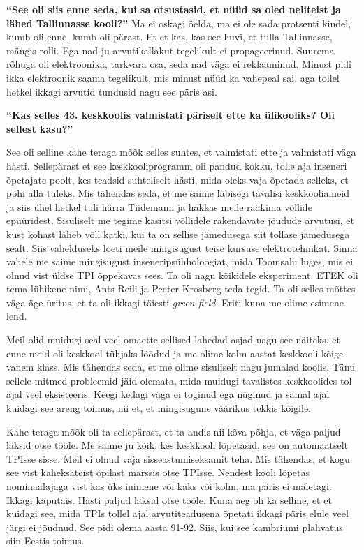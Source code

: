 \textbf{\enquote{See oli siis enne seda, kui sa otsustasid, et nüüd sa oled 
neliteist ja lähed Tallinnasse kooli?}}
Ma ei oskagi öelda, ma ei ole sada protsenti kindel, kumb oli enne, kumb oli 
pärast. Et et kas, kas see huvi, et tulla Tallinnasse, mängis rolli. Ega nad ju 
arvutikallakut tegelikult ei propageerinud.  Suurema rõhuga oli  elektroonika, 
tarkvara osa, seda nad väga ei reklaaminud. Minust pidi ikka elektroonik saama 
tegelikult, mis minust nüüd ka vahepeal sai, aga tollel hetkel ikkagi arvutid 
tundusid nagu see päris asi. 

\textbf{\enquote{Kas selles 43. keskkoolis valmistati päriselt ette ka 
ülikooliks? Oli sellest kasu?}}

See oli selline kahe teraga mõõk selles suhtes, et valmistati ette ja 
valmistati väga hästi. Sellepärast et see keskkooliprogramm oli pandud kokku, 
tolle aja inseneri õpetajate poolt, kes teadsid suhteliselt hästi, mida oleks 
vaja õpetada selleks, et põhi alla tuleks. Mis tähendas seda, et me saime 
läbisegi  tavalisi keskkooliaineid ja siis ühel hetkel tuli härra 
Tiidemann ja hakkas meile rääkima võllide 
epüüridest. Sisuliselt me tegime käsitsi võllidele 
rakendavate jõudude arvutusi, et kust kohast läheb võll katki, kui ta on 
sellise jämedusega siit tollase jämedusega sealt. Siis vahelduseks loeti meile 
mingisugust teise kursuse elektrotehnikat. Sinna vahele me saime mingisugust 
inseneripsühholoogiat, mida Toomsalu luges, mis ei 
olnud vist üldse TPI õppekavas sees. Ta oli nagu kõikidele eksperiment. 
ETEK  oli tema lühikene nimi, Ants Reili ja 
Peeter Krosberg teda tegid. Ta oli selles mõttes 
väga äge üritus, et ta oli ikkagi täiesti \emph{green-field}. Eriti kuna me 
olime esimene lend. 

Meil olid muidugi seal veel omaette sellised lahedad asjad nagu see näiteks, et 
enne meid oli keskkool tühjaks löödud ja me olime kolm aastat keskkooli kõige 
vanem klass. Mis tähendas seda, et me olime sisuliselt nagu jumalad koolis. 
Tänu sellele mitmed probleemid jäid olemata, mida muidugi tavalistes 
keskkoolides tol ajal veel eksisteeris. Keegi kedagi väga ei toginud ega 
nüginud ja samal ajal kuidagi see areng toimus, nii et, et mingisugune väärikus 
tekkis kõigile. 

Kahe teraga mõõk oli ta sellepärast, et ta andis nii kõva põhja, et väga paljud 
läksid otse tööle. Me saime ju kõik, kes keskkooli lõpetasid, see on 
automaatselt TPIsse sisse. Meil ei olnud vaja sisseastumiseksamit teha. Mis 
tähendas, et kogu see vist kaheksateist õpilast marssis otse TPIsse. Nendest 
kooli lõpetas nominaalajaga vist  kas üks inimene või kaks või kolm, ma päris 
ei mäletagi. Ikkagi käputäis. Hästi paljud läksid otse tööle. Kuna aeg oli ka 
selline, et et kuidagi see, mida TPIs tollel ajal arvutiteadusena õpetati 
ikkagi päris elule veel järgi ei jõudnud. See pidi olema aasta 91-92. Siis, kui 
see kambriumi plahvatus siin Eestis toimus.

